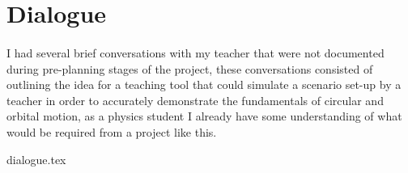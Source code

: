 \section{Dialogue}
\paragraph{}
I had several brief conversations with my teacher that were not documented during pre-planning stages of the project, these conversations consisted of outlining the idea for a teaching tool that could simulate a scenario set-up by a teacher in order to accurately demonstrate the fundamentals of circular and orbital motion, as a physics student I already have some understanding of what would be required from a project like this.

\begin{small}
{dialogue.tex}
\end{small}

